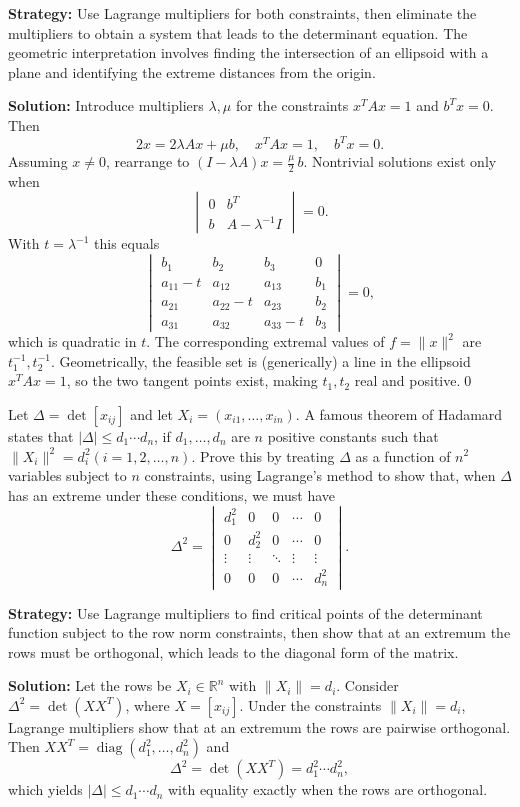 \noindent\textbf{Strategy:} Use Lagrange multipliers for both constraints, then eliminate the multipliers to obtain a system that leads to the determinant equation. The geometric interpretation involves finding the intersection of an ellipsoid with a plane and identifying the extreme distances from the origin.

\bigskip\noindent\textbf{Solution:}
Introduce multipliers $\lambda,\mu$ for the constraints $x^{\!T}Ax=1$ and $b^{\!T}x=0$. Then
\[2x=2\lambda Ax+\mu b,\quad x^{\!T}Ax=1,\quad b^{\!T}x=0.
\]
Assuming $x\neq 0$, rearrange to $(I-\lambda A)x=\tfrac{\mu}{2}\,b$. Nontrivial solutions exist only when
\[\begin{vmatrix}
0 & b^{\!T} \\
b & A-\lambda^{-1}I
\end{vmatrix}=0.
\]
With $t=\lambda^{-1}$ this equals
\[\begin{vmatrix}
b_1 & b_2 & b_3 & 0 \\
a_{11} - t & a_{12} & a_{13} & b_1 \\
a_{21} & a_{22} - t & a_{23} & b_2 \\
a_{31} & a_{32} & a_{33} - t & b_3
\end{vmatrix}=0,
\]
which is quadratic in $t$. The corresponding extremal values of $f=\|x\|^2$ are $t_1^{-1}, t_2^{-1}$. Geometrically, the feasible set is (generically) a line in the ellipsoid $x^{\!T}Ax=1$, so the two tangent points exist, making $t_1,t_2$ real and positive.\qed


\begin{problembox}
Let \(\Delta = \det [x_{ij}]\) and let \(X_i = (x_{i1}, \ldots, x_{in})\). A famous theorem of Hadamard states that \(|\Delta| \leq d_1 \cdots d_n\), if \(d_1, \ldots, d_n\) are \(n\) positive constants such that \(\| X_i \|^2 = d_i^2 (i = 1, 2, \ldots, n)\). Prove this by treating \(\Delta\) as a function of \(n^2\) variables subject to \(n\) constraints, using Lagrange's method to show that, when \(\Delta\) has an extreme under these conditions, we must have
\[\Delta^2 = 
\begin{vmatrix}
d_1^2 & 0 & 0 & \cdots & 0 \\
0 & d_2^2 & 0 & \cdots & 0 \\
\vdots & \vdots & \ddots & \vdots & \vdots \\
0 & 0 & 0 & \cdots & d_n^2
\end{vmatrix}.\]
\end{problembox}

\noindent\textbf{Strategy:} Use Lagrange multipliers to find critical points of the determinant function subject to the row norm constraints, then show that at an extremum the rows must be orthogonal, which leads to the diagonal form of the matrix.

\bigskip\noindent\textbf{Solution:}
Let the rows be $X_i\in\mathbb R^n$ with $\|X_i\|=d_i$. Consider $\Delta^2=\det(XX^{\!T})$, where $X=[x_{ij}]$. Under the constraints $\|X_i\|=d_i$, Lagrange multipliers show that at an extremum the rows are pairwise orthogonal. Then $XX^{\!T}=\operatorname{diag}(d_1^2,\dots,d_n^2)$ and
\[\Delta^2=\det(XX^{\!T})=d_1^2\cdots d_n^2,\]
which yields $|\Delta|\le d_1\cdots d_n$ with equality exactly when the rows are orthogonal.